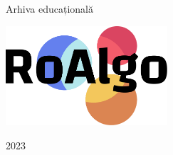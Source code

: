 \begin{titlepage}
    \centering
    \vfill
    {\Huge Arhiva educațională\par}
    \vspace{3\baselineskip}
    \includegraphics[width=6cm]{images/roalgo_logo.pdf}\par
    \vfill
    {\large\textsc{2023}}
    \vspace{4\baselineskip}
\end{titlepage}